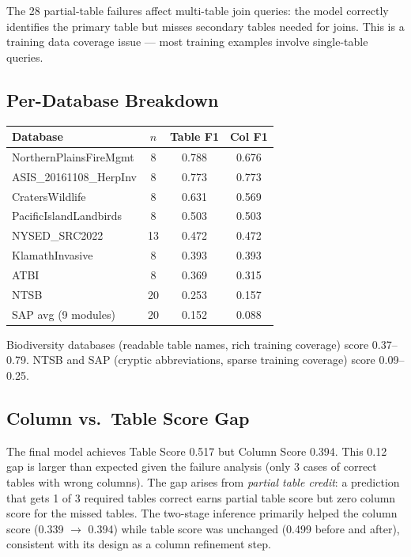 \documentclass[10pt,twocolumn]{article}
\begin{document}
The 28 partial-table failures affect multi-table join queries: the model correctly identifies the primary table but misses secondary tables needed for joins. This is a training data coverage issue — most training examples involve single-table queries.

\subsection*{Per-Database Breakdown}

\begin{center}
\scriptsize
\begin{tabular}{@{}lccc@{}}
\toprule
Database & $n$ & Table F1 & Col F1 \\
\midrule
NorthernPlainsFireMgmt & 8 & 0.788 & 0.676 \\
ASIS\_20161108\_HerpInv & 8 & 0.773 & 0.773 \\
CratersWildlife & 8 & 0.631 & 0.569 \\
PacificIslandLandbirds & 8 & 0.503 & 0.503 \\
NYSED\_SRC2022 & 13 & 0.472 & 0.472 \\
KlamathInvasive & 8 & 0.393 & 0.393 \\
ATBI & 8 & 0.369 & 0.315 \\
NTSB & 20 & 0.253 & 0.157 \\
SAP avg (9 modules) & 20 & 0.152 & 0.088 \\
\bottomrule
\end{tabular}
\end{center}

Biodiversity databases (readable table names, rich training coverage) score 0.37--0.79. NTSB and SAP (cryptic abbreviations, sparse training coverage) score 0.09--0.25.

\subsection*{Column vs.\ Table Score Gap}
The final model achieves Table Score 0.517 but Column Score 0.394. This 0.12 gap is larger than expected given the failure analysis (only 3 cases of correct tables with wrong columns). The gap arises from \textit{partial table credit}: a prediction that gets 1 of 3 required tables correct earns partial table score but zero column score for the missed tables. The two-stage inference primarily helped the column score (0.339 $\to$ 0.394) while table score was unchanged (0.499 before and after), consistent with its design as a column refinement step.
\end{document}
